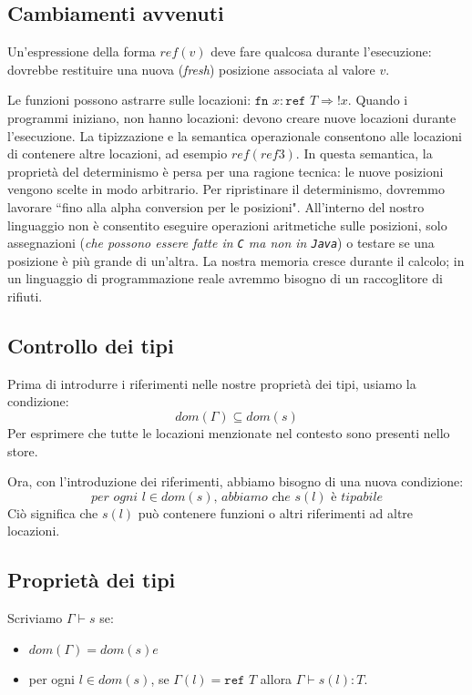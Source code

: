 \subsection{Cambiamenti avvenuti}
Un'espressione della forma \(ref(v)\) deve fare qualcosa durante l'esecuzione:
dovrebbe restituire una nuova (\textit{fresh}) posizione associata al valore \(v\).

Le funzioni possono astrarre sulle locazioni: \(\texttt{fn }x: \texttt{ref }T \Rightarrow !x\).
Quando i programmi iniziano, non hanno locazioni: devono creare nuove locazioni durante l'esecuzione.
La tipizzazione e la semantica operazionale consentono alle locazioni di contenere altre locazioni,
ad esempio \(ref(ref3)\). In questa semantica, la proprietà del determinismo è persa per una ragione
tecnica: le nuove posizioni vengono scelte in modo arbitrario. Per ripristinare il determinismo,
dovremmo lavorare ``fino alla alpha conversion per le posizioni". All'interno del nostro linguaggio
non è consentito eseguire operazioni aritmetiche sulle posizioni, solo assegnazioni
(\textit{che possono essere fatte in \texttt{C} ma non in \texttt{Java}}) o testare se una posizione
è più grande di un'altra. La nostra memoria cresce durante il calcolo; in un linguaggio di programmazione
reale avremmo bisogno di un raccoglitore di rifiuti.
\subsection{Controllo dei tipi}
Prima di introdurre i riferimenti nelle nostre proprietà dei tipi, usiamo la condizione:
\[
  dom(\Gamma) \subseteq dom(s)  
\]
Per esprimere che tutte le locazioni menzionate nel contesto sono presenti nello store.

Ora, con l'introduzione dei riferimenti, abbiamo bisogno di una nuova condizione:
\[
  \textit{per ogni } l \in dom(s) \textit{, abbiamo che } s(l) \textit{ è tipabile}
\]
Ciò significa che $s(l)$ può contenere funzioni o altri riferimenti ad altre locazioni.
\subsection{Proprietà dei tipi}
\begin{tcolorbox}[title = Store ben tipato]
    Scriviamo $\Gamma \vdash s$ se:
    \begin{itemize}
        \item $dom(\Gamma) = dom(s) e$
        \item per ogni $l \in dom(s)$, se $\Gamma(l) = \texttt{ref }T$ allora $\Gamma \vdash s(l) : T$.
    \end{itemize}
\end{tcolorbox}

